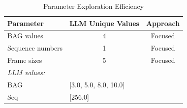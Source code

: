 \begin{table}[ht]
\centering
\caption{Parameter Exploration Efficiency}
\label{tab:efficiency}
\small
\begin{tabular}{lcc}
\toprule
\textbf{Parameter} & \textbf{LLM Unique Values} & \textbf{Approach} \\
\midrule
BAG values & 4 & Focused \\
Sequence numbers & 1 & Focused \\
Frame sizes & 5 & Focused \\
\midrule
\multicolumn{3}{l}{\textit{LLM values:}} \\
\quad BAG & \multicolumn{2}{l}{[3.0, 5.0, 8.0, 10.0]} \\
\quad Seq & \multicolumn{2}{l}{[256.0]} \\
\bottomrule
\end{tabular}
\end{table}
